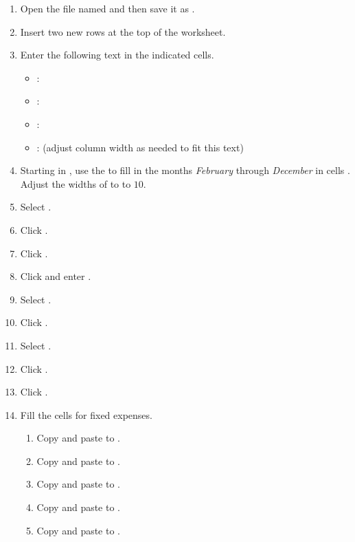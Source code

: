 \begin{enumbox}
	\begin{enumerate}
		\item Open the file named  and then save it as .
		\item Insert two new rows at the top of the worksheet.
		\item Enter the following text in the indicated cells.
	
	\begin{itemize}
		\item {}: 
		\item {}: 
		\item {}: 
		\item {}:  (adjust column width as needed to fit this text)
	\end{itemize}
	
		\item Starting in , use the  to fill in the months \textit{February} through \textit{December} in cells . Adjust the widths of  to  to $ 10 $.
		\item Select .
		\item Click .
		\item Click . 
		\item Click  and enter . 
		\item Select .
		\item Click .
		\item Select .
		\item Click .
		\item Click . 
	
		\item Fill the cells for fixed expenses.
		\begin{enumerate}
			\item Copy  and paste to .
			\item Copy  and paste to .
			\item Copy  and paste to .
			\item Copy  and paste to .
			\item Copy  and paste to .
		\end{enumerate}	
		

\end{enumerate}
\end{enumbox}
